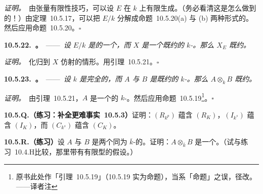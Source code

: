 \emph{证明。}\ 由张量有限性技巧，可以设 $E$ 在 $k$ 上有限生成。（务必看清这是怎么做到的！）由定理~10.5.17，可以把 $E/k$ 分解成命题~10.5.20(a) 与 (b) 两种形式的\trExtension。然后应用命题~10.5.20。\hfill$\square$

\textbf{10.5.22.\ \trhProposition{}。}\ ——\ \emph{设 $E/k$ 是\trPerfectField{}的一个\trFieldExtension，而 $X$ 是一个既约的 $k$-\trScheme。那么 $X_E$ 既约。}

\emph{证明。}\ 化归到 $X$ 仿射的情形。用引理~10.5.21。\hfill$\square$

\textbf{10.5.23.\ \trhCorollary{}。}\ ——\ \emph{设 $k$ 是完全的，而 $A$ 与 $B$ 是既约的 $k$-\trAlgebra。那么 $A\otimes_k B$ 既约。}

\emph{证明。}\ 由引理~10.5.21，$A$ 是一个\trGeometricallyReduced{}的 $k$-\trAlgebra。然后应用命题~10.5.19\footnote{原书此处作「引理~10.5.19」（10.5.19 实为命题），当系「命题」之误，径改。——译者注}。\hfill$\square$

\textbf{10.5.Q.（练习：补全更难事实~10.5.3）}\quad 证明：$(R_{k^p})$ 蕴含 $(R_K)$，$(I_{k^s})$ 蕴含 $(I_K)$，而 $(C_{k^s})$ 蕴含 $(C_K)$。

\textbf{10.5.R.（练习）}\quad 设 $A$ 与 $B$ 是两个同为 $\overline{k}$-\trAlgebra{}的\trIntegralDomain。证明：$A\otimes_{\overline{k}}B$ 是一个\trIntegralDomain。（试与\mbox{练习~10.4.H}比较，那里带有有限型的假设。）

